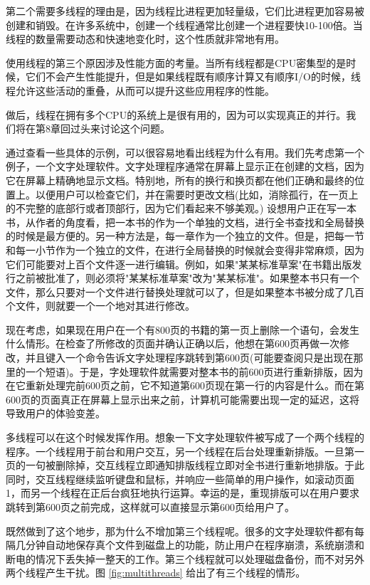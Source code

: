 	第二个需要多线程的理由是，因为线程比进程更加轻量级，它们比进程更加容易被创建和销毁。在许多系统中，创建一个线程通常比创建一个进程要快10-100倍。当线程的数量需要动态和快速地变化时，这个性质就非常地有用。
	
	使用线程的第三个原因涉及性能方面的考量。当所有线程都是CPU密集型的是时候，它们不会产生性能提升，但是如果线程既有顺序计算又有顺序I/O的时候，线程允许这些活动的重叠，从而可以提升这些应用程序的性能。
	
	做后，线程在拥有多个CPU的系统上是很有用的，因为可以实现真正的并行。我们将在第8章回过头来讨论这个问题。
	
	通过查看一些具体的示例，可以很容易地看出线程为什么有用。我们先考虑第一个例子，一个文字处理软件。文字处理程序通常在屏幕上显示正在创建的文档，因为它在屏幕上精确地显示文档。特别地，所有的换行和换页都在他们正确和最终的位置上。以便用户可以检查它们，并在需要时更改文档(比如，消除孤行，在一页上的不完整的底部行或者顶部行，因为它们看起来不够美观。)
	设想用户正在写一本书，从作者的角度看，把一本书的作为一个单独的文档，进行全书查找和全局替换的时候是最方便的。另一种方法是，每一章作为一个独立的文件。但是，把每一节和每一小节作为一个独立的文件，在进行全局替换的时候就会变得非常麻烦，因为它们可能要对上百个文件逐一进行编辑。例如，如果"某某标准草案"在书籍出版发行之前被批准了，则必须将"某某标准草案"改为"某某标准"。如果整本书只有一个文件，那么只要对一个文件进行替换处理就可以了，但是如果整本书被分成了几百个文件，则就要一个一个地对其进行修改。
	
	现在考虑，如果现在用户在一个有800页的书籍的第一页上删除一个语句，会发生什么情形。在检查了所修改的页面并确认正确以后，他想在第600页再做一次修改，并且键入一个命令告诉文字处理程序跳转到第600页(可能要查阅只是出现在那里的一个短语)。于是，字处理软件就需要对整本书的前600页进行重新排版，因为在它重新处理完前600页之前，它不知道第600页现在第一行的内容是什么。而在第600页的页面真正在屏幕上显示出来之前，计算机可能需要出现一定的延迟，这将导致用户的体验变差。
	
	多线程可以在这个时候发挥作用。想象一下文字处理软件被写成了一个两个线程的程序。一个线程用于前台和用户交互，另一个线程在后台处理重新排版。一旦第一页的一句被删除掉，交互线程立即通知排版线程立即对全书进行重新地排版。于此同时，交互线程继续监听键盘和鼠标，并响应一些简单的用户操作，如滚动页面1，而另一个线程在正后台疯狂地执行运算。幸运的是，重现排版可以在用户要求跳转到第600页之前完成，这样就可以直接显示第600页给用户了。
	
	既然做到了这个地步，那为什么不增加第三个线程呢。很多的文字处理软件都有每隔几分钟自动地保存真个文件到磁盘上的功能，防止用户在程序崩溃，系统崩溃和断电的情况下丢失掉一整天的工作。第三个线程就可以处理磁盘备份，而不对另外两个线程产生干扰。图 \ref{fig:multithreads} 给出了有三个线程的情形。

